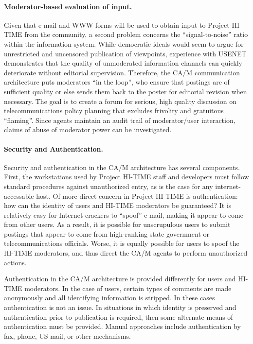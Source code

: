 \paragraph{Moderator-based evaluation of input.} 
Given that e-mail and WWW forms will be used to obtain input to Project
HI-TIME from the community, a second problem concerns the
``signal-to-noise'' ratio within the information system.  While democratic
ideals would seem to argue for unrestricted and uncensored publication of
viewpoints, experience with USENET demonstrates that the quality of
unmoderated information channels can quickly deteriorate without editorial
supervision.  Therefore, the CA/M communication architecture puts
moderators ``in the loop'', who ensure that postings are of sufficient
quality or else sends them back to the poster for editorial revision when
necessary.  The goal is to create a forum for serious, high quality
discussion on telecommunications policy planning that excludes frivolity
and gratuitous ``flaming''.  Since agents maintain an audit trail of
moderator/user interaction, claims of abuse of moderator power can be
investigated.


\paragraph{Security and Authentication.}  

Security and authentication in the CA/M architecture has several
components.  First, the workstations used by Project HI-TIME staff and
developers must follow standard procedures against unauthorized entry, as
is the case for any internet-accessable host.  Of more direct concern in
Project HI-TIME is authentication: how can the identity of users and
HI-TIME moderators be guaranteed?  It is relatively easy for Internet
crackers to ``spoof'' e-mail, making it appear to come from other users.
As a result, it is possible for unscrupulous users to submit postings that
appear to come from high-ranking state government or telecommunications
officials. Worse, it is equally possible for users to spoof the HI-TIME
moderators, and thus direct the CA/M agents to perform unauthorized
actions.  

Authentication in the CA/M architecture is provided differently for users
and HI-TIME moderators.  In the case of users, certain types of comments
are made anonymously and all identifying information is stripped. In these
cases authentication is not an issue.  In situations in which identity is
preserved and authentication prior to publication is required, then some
alternate means of authentication must be provided.  Manual approaches
include authentication by fax, phone, US mail, or other mechanisms.

